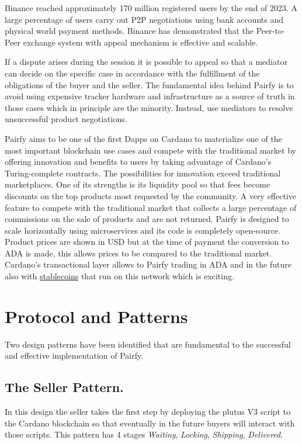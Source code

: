 \documentclass[12pt]{article}
\begin{document}
Binance reached approximately 170 million registered users by the end of 2023. A large percentage of users carry out P2P negotiations using bank accounts and physical world payment methods. Binance has demonstrated that the Peer-to-Peer exchange system with appeal mechanism is effective and scalable.

If a dispute arises during the session it is possible to appeal so that a mediator can decide on the specific case in accordance with the fulfillment of the obligations of the buyer and the seller. The fundamental idea behind Pairfy is to avoid using expensive tracker hardware and infrastructure as a source of truth in those cases which in principle are the minority. Instead, use mediators to resolve unsuccessful product negotiations.

Pairfy aims to be one of the first Dapps on Cardano to materialize one of the most important blockchain use cases and compete with the traditional market by offering innovation and benefits to users by taking advantage of Cardano's Turing-complete contracts. The possibilities for innovation exceed traditional marketplaces. One of its strengths is its liquidity pool so that fees become discounts on the top products most requested by the community. 
A very effective feature to compete with the traditional market that collects a large percentage of commissions on the sale of products and are not returned. Pairfy is designed to scale horizontally using microservices and its code is completely open-source.
Product prices are shown in USD but at the time of payment the conversion to ADA is made, this allows prices to be compared to the traditional market. Cardano's transactional layer allows to Pairfy trading in ADA and in the future also with \underline{stablecoins} that run on this network which is exciting.

\section{ Protocol and Patterns }

Two design patterns have been identified that are fundamental to the successful and effective implementation of Pairfy.

\subsection { The Seller Pattern. } 

In this design the seller takes the first step by deploying the plutus V3 script to the Cardano blockchain so that eventually in the future buyers will interact with those scripts. This pattern has 4 stages \emph{Waiting}, \emph{Locking}, \emph{Shipping}, \emph{Delivered}.
\end{document}
